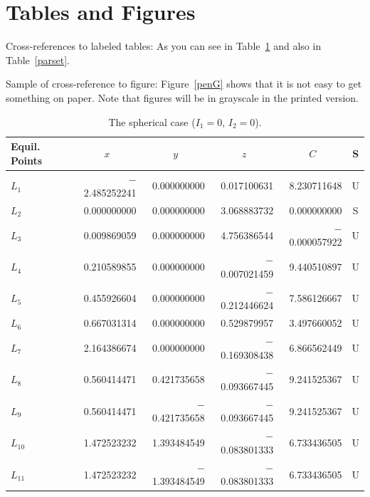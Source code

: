 \documentclass[ecta,nameyear,draft]{econsocart}
\theoremstyle{plain}
\theoremstyle{remark}
\begin{document}
\section{Tables and Figures}
Cross-references to labeled tables: As you can see in Table~\ref{sphericcase}
and also in Table~\ref{parset}.

Sample of cross-reference to figure: Figure~\ref{penG} shows that it is not easy to get something on paper. Note that figures will be in grayscale in the printed version.
\begin{table}
\caption{The spherical case ($I_1=0$, $I_2=0$).}
\label{sphericcase}
\begin{tabular}{@{}lrrrrc@{}@{}}
\hline
Equil. Points
& \multicolumn{1}{c}{$x$}
& \multicolumn{1}{c}{$y$}
& \multicolumn{1}{c}{$z$}
& \multicolumn{1}{c}{$C$}
& S \\
\hline
$L_1$    & $-$2.485252241 & 0.000000000    & 0.017100631    & 8.230711648    & U \\
$L_2$    & 0.000000000    & 0.000000000    & 3.068883732    & 0.000000000    & S \\
$L_3$    & 0.009869059    & 0.000000000    & 4.756386544    & $-$0.000057922 & U \\
$L_4$    & 0.210589855    & 0.000000000    & $-$0.007021459 & 9.440510897    & U \\
$L_5$    & 0.455926604    & 0.000000000    & $-$0.212446624 & 7.586126667    & U \\
$L_6$    & 0.667031314    & 0.000000000    & 0.529879957    & 3.497660052    & U \\
$L_7$    & 2.164386674    & 0.000000000    & $-$0.169308438 & 6.866562449    & U \\
$L_8$    & 0.560414471    & 0.421735658    & $-$0.093667445 & 9.241525367    & U \\
$L_9$    & 0.560414471    & $-$0.421735658 & $-$0.093667445 & 9.241525367    & U \\
$L_{10}$ & 1.472523232    & 1.393484549    & $-$0.083801333 & 6.733436505    & U \\
$L_{11}$ & 1.472523232    & $-$1.393484549 & $-$0.083801333 & 6.733436505    & U \\
\hline
\end{tabular}

\end{table}
\end{document}
